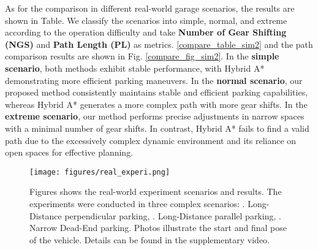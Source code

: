 \documentclass[ conference]{./support/ieeeconf}
\begin{document}
\begin{table}[t]
\vspace{0.4cm}
    \centering
    \caption{Comparison in Real-World Dataset}
    \label{compare_table_sim2}
\vspace{-1cm}
\end{table}

As for the comparison in different real-world garage scenarios, the results are shown in Table. 
We classify the scenarios into simple, normal, and extreme according to the operation difficulty and take \textbf{Number of Gear Shifting (NGS)} and \textbf{Path Length (PL)} as metrics. \ref{compare_table_sim2} and the path comparison results are shown in Fig. \ref{compare_fig_sim2}. 
In the \textbf{simple scenario}, both methods exhibit stable performance, with Hybrid A* demonstrating more efficient parking maneuvers. 
In the \textbf{normal scenario}, our proposed method consistently maintains stable and efficient parking capabilities, whereas Hybrid A* generates a more complex path with more gear shifts. 
In the \textbf{extreme scenario}, our method performs precise adjustments in narrow spaces with a minimal number of gear shifts. 
In contrast, Hybrid A* fails to find a valid path due to the excessively complex dynamic environment and its reliance on open spaces for effective planning.

\begin{figure*}[t]
	\centering
	\texttt{[image: figures/real\_experi.png]}
        \vspace{-0.5cm}
	\caption{
		Figures shows the real-world experiment scenarios and results. The experiments were conducted in three complex scenarios: \uppercase\expandafter{}. Long-Distance perpendicular parking, \uppercase\expandafter{}. Long-Distance parallel parking, \uppercase\expandafter{}. Narrow Dead-End parking. Photos illustrate the start and final pose of the vehicle.
  Details can be found in the supplementary video.
	}
	\label{real_result_fig}
 \vspace{-0.5cm}
\end{figure*}
\end{document}
